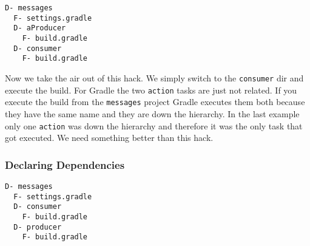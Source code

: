 \begin{minipage}[t]{7cm}
\begin{Verbatim}[frame=single,label=Project Tree]
D- messages
  F- settings.gradle
  D- aProducer
    F- build.gradle
  D- consumer
    F- build.gradle
\end{Verbatim}
\end{minipage}	
\begin{minipage}[t]{9cm}
\end{minipage}

Now we take the air out of this hack. We simply switch to the \texttt{consumer} dir and execute the build.
For Gradle the two \texttt{action} tasks are just not related. If you execute the build from the \texttt{messages} project Gradle executes them both because they have the same name and they are down the hierarchy. In the last example only one \texttt{action} was down the hierarchy and therefore it was the only task that got executed. We need something better than this hack.
\subsubsection{Declaring Dependencies} %
\label{ssub:declaring_dependencies}

\begin{minipage}[t]{7cm}
\begin{Verbatim}[frame=single,label=Project Tree]
D- messages
  F- settings.gradle
  D- consumer
    F- build.gradle
  D- producer
    F- build.gradle
\end{Verbatim}
\end{minipage}	
\begin{minipage}[t]{9cm}
\end{minipage}

